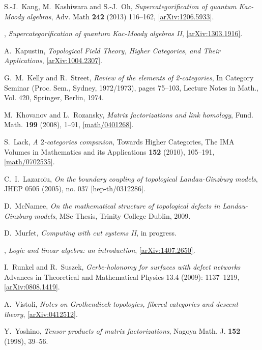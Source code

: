 \documentclass[english,letter paper,12pt,leqno]{article}
\theoremstyle{example}
\numberwithin{equation}{section}
\begin{document}
\begin{thebibliography}{BHLS03}
S.-J.~Kang, M.~Kashiwara and S.-J.~Oh, \textsl{Supercategorification of quantum Kac-Moody algebras}, Adv. Math \textbf{242} (2013) 116--162, \href{http://arxiv.org/abs/1206.5933}{[arXiv:1206.5933]}.

\bysame, \textsl{Supercategorification of quantum Kac-Moody algebras II}, \href{http://arxiv.org/abs/1303.1916}{[arXiv:1303.1916]}.

A.~Kapustin, \textsl{Topological {F}ield {T}heory, {H}igher {C}ategories, and
  {T}heir {A}pplications},
  \href{http://arxiv.org/abs/1004.2307}{[arXiv:1004.2307]}.
  
G.~M.~Kelly and R.~Street, \textsl{Review of the elements of 2-categories}, In Category Seminar (Proc. Sem., Sydney, 1972/1973), pages 75--103, Lecture Notes in Math., Vol. 420, Springer, Berlin, 1974.

M.~Khovanov and L.~Rozansky, \textsl{Matrix factorizations and link homology}, Fund. Math.
  \textbf{199} (2008), 1--91,
  \href{http://arxiv.org/abs/math/0401268}{[math/0401268]}.
  
S.~Lack, \textsl{A $2$-categories companion}, 
Towards Higher Categories, 
The IMA Volumes in Mathematics and its Applications \textbf{152} (2010), 105--191, 
\href{http://arxiv.org/abs/math/0702535}{[math/0702535]}.

C.~I.~Lazaroiu, \textsl{On the boundary coupling of topological {L}andau-{G}inzburg models}, JHEP 0505 (2005), no. 037 [hep-th/0312286].
  
D.~McNamee, \textsl{On the mathematical structure of topological defects in
  {L}andau-{G}inzburg models}, MSc Thesis, Trinity College Dublin, 2009.
  
D.~Murfet, \textsl{Computing with cut systems II}, in progress.

\bysame, \textsl{Logic and linear algebra: an introduction}, \href{http://arxiv.org/abs/1407.2650}{[arXiv:1407.2650]}.


I.~Runkel and R.~Suszek, \textsl{Gerbe-holonomy for surfaces with defect networks} Advances in Theoretical and Mathematical Physics 13.4 (2009): 1137--1219, \href{http://arxiv.org/abs/0808.1419}{[arXiv:0808.1419]}.

A.~Vistoli, \textsl{Notes on {G}rothendieck topologies, fibered categories and descent theory}, \href{http://arxiv.org/abs/math/0412512}{[arXiv:0412512]}.

Y.~Yoshino, \textsl{Tensor products of matrix factorizations}, Nagoya Math. J.
  \textbf{152} (1998), 39--56.
  
\end{thebibliography}
\end{document}
